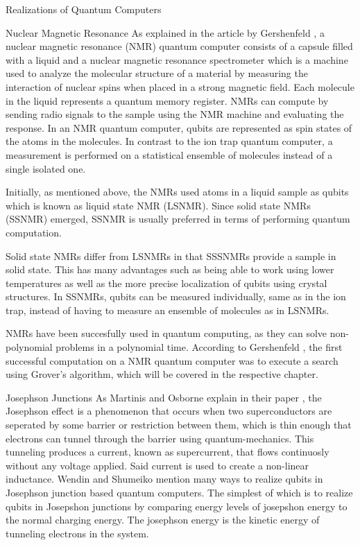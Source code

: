 \documentclass[aps,preprintnumbers,twocolumn]{revtex4}
\begin{document}
\begin{section}{Realizations of Quantum Computers}
\begin{subsection}{Nuclear Magnetic Resonance}
As explained in the article by Gershenfeld \cite[p.66-71]{Gershenfeld1998QuantumCW}, a nuclear magnetic resonance (NMR) quantum computer consists of a capsule filled with a liquid and a nuclear magnetic resonance spectrometer which is a machine used to analyze the molecular structure of a material by measuring the interaction of nuclear spins when placed in a strong magnetic field.
Each molecule in the liquid represents a quantum memory register. 
NMRs can compute by sending radio signals to the sample using the NMR machine and evaluating the response. 
In an NMR quantum computer, qubits are represented as spin states of the atoms in the molecules. 
In contrast to the ion trap quantum computer, 
a measurement is performed on a statistical ensemble of molecules instead of a single isolated one. 

Initially, as mentioned above, the NMRs used atoms in a liquid sample as qubits which is known as liquid state NMR (LSNMR). 
Since solid state NMRs (SSNMR) emerged, SSNMR is usually preferred in terms of performing quantum computation.

Solid state NMRs differ from LSNMRs in that SSSNMRs provide a sample in solid state.
This has many advantages such as being able to work using lower temperatures as well as the more precise localization of qubits using crystal structures.
In SSNMRs, qubits can be measured individually, same as in the ion trap,
instead of having to measure an ensemble of molecules as in LSNMRs. 

NMRs have been succesfully used in quantum computing, as they can solve non-polynomial problems in a polynomial time.
According to Gershenfeld \cite[p.69]{Gershenfeld1998QuantumCW}, the first successful computation on a NMR quantum computer was to execute a search using Grover's algorithm, 
which will be covered in the respective chapter. 
\end{subsection}

\begin{subsection}{Josephson Junctions}
As Martinis and Osborne explain in their paper \cite[p.3-6]{martinis}, 
the Josephson effect is a phenomenon that occurs when two superconductors are seperated 
by some barrier or restriction between them, which is thin enough that electrons can tunnel through the barrier using quantum-mechanics. 
This tunneling produces a current, known as supercurrent, that flows continuosly without any voltage applied.
Said current is used to create a non-linear inductance. 
Wendin and Shumeiko mention \cite[p.727]{shumeiko} many ways to realize qubits in Josephson junction based quantum computers. 
The simplest of which is to realize qubits in Josepshon junctions by comparing energy levels of josepshon energy to the normal charging energy. 
The josephson energy is the kinetic energy of tunneling electrons in the system.


\end{subsection}
\end{section}
\end{document}
